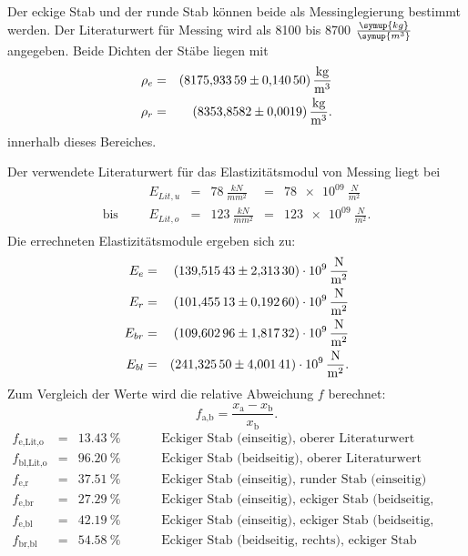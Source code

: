 Der eckige Stab und der runde Stab können beide als Messinglegierung bestimmt werden.
Der Literaturwert für Messing \cite{1} wird als 8100 bis 8700 $\frac{\symup{kg}}{\symup{m^3}}$ angegeben.
Beide Dichten der Stäbe liegen mit
\begin{align*}
  \rho_{e} &=& \SI{8175.93359 \pm 0.14050}{\frac{kg}{m^3}}\\
  \rho_{r} &=& \SI{8353.8582 \pm 0.0019}{\frac{kg}{m^3}}.\\
\end{align*}
innerhalb dieses Bereiches.

Der verwendete Literaturwert \cite{2} für das Elastizitätsmodul von Messing liegt bei
\begin{align*}
              &&&  E_{Lit,u} &=& \SI{ 78}{\frac{kN}{mm^2}} &=& \SI{ 78e09}{\frac{N}{m^2}} \\
   \text{bis} &&&  E_{Lit,o} &=& \SI{123}{\frac{kN}{mm^2}} &=& \SI{123e09}{\frac{N}{m^2}}.\\
\end{align*}
Die errechneten Elastizitätsmodule ergeben sich zu:
\begin{align*}
  E_{e}  &=&  \SI{139.51543 \pm 2.31330e09}{\frac{N}{m^2}}\\
  E_{r}  &=&  \SI{101.45513 \pm 0.19260e09}{\frac{N}{m^2}}\\
  E_{br} &=&  \SI{109.60296 \pm 1.81732e09}{\frac{N}{m^2}}\\
  E_{bl} &=&  \SI{241.32550 \pm 4.00141e09}{\frac{N}{m^2}}.\\
\end{align*}
Zum Vergleich der Werte wird die relative Abweichung $f$ berechnet:
\begin{equation*}
  f_{\text{a,b}}=\frac{x_{\text{a}}-x_{\text{b}}}{x_{\text{b}}}.
\end{equation*}
\begin{align*}
  f_{\text{e,Lit,o}}  &=& \SI{13.43}{\%}  &&&& \text{Eckiger Stab (einseitig), oberer Literaturwert}\\
  f_{\text{bl,Lit,o}} &=& \SI{96.20}{\%}  &&&& \text{Eckiger Stab (beidseitig), oberer Literaturwert}\\
  f_{\text{e,r}}      &=& \SI{37.51}{\%}  &&&& \text{Eckiger Stab (einseitig), runder Stab (einseitig)}\\
  f_{\text{e,br}}     &=& \SI{27.29}{\%}  &&&& \text{Eckiger Stab (einseitig), eckiger Stab (beidseitig, rechts)}\\
  f_{\text{e,bl}}     &=& \SI{42.19}{\%}  &&&& \text{Eckiger Stab (einseitig), eckiger Stab (beidseitig, links)}\\
  f_{\text{br,bl}}    &=& \SI{54.58}{\%}  &&&& \text{Eckiger Stab (beidseitig, rechts), eckiger Stab (beidseitig, links)}\\
\end{align*}
